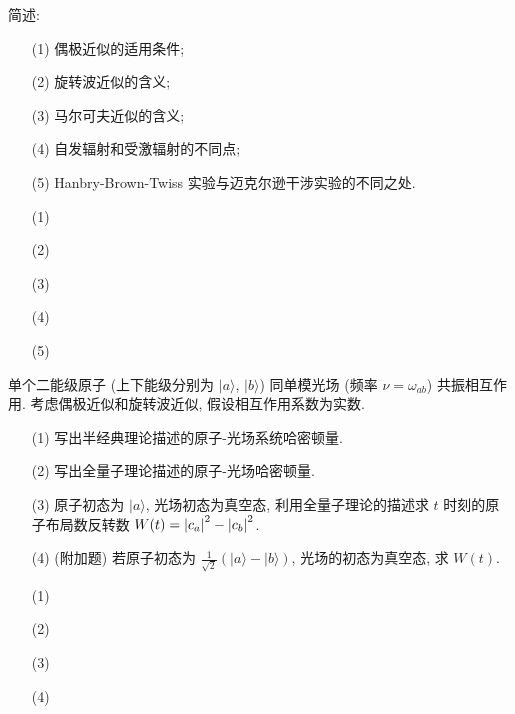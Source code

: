 \documentclass{assignment}
\begin{document}
\begin{prob}
    简述:
    \begin{itemize}
        \item[(1)] 偶极近似的适用条件;
        \item[(2)] 旋转波近似的含义;
        \item[(3)] 马尔可夫近似的含义;
        \item[(4)] 自发辐射和受激辐射的不同点;
        \item[(5)] Hanbry-Brown-Twiss 实验与迈克尔逊干涉实验的不同之处.
    \end{itemize}
\end{prob}
\begin{sol}
    \begin{itemize}
        \item[(1)] 
        \item[(2)] 
        \item[(3)] 
        \item[(4)] 
        \item[(5)] 
    \end{itemize}
\end{sol}

\begin{prob}
    单个二能级原子 (上下能级分别为 $\lvert a\rangle$, $\lvert b\rangle$) 同单模光场 (频率 $\nu=\omega_{ab}$) 共振相互作用. 考虑偶极近似和旋转波近似, 假设相互作用系数为实数.
    \begin{itemize}
        \item[(1)] 写出半经典理论描述的原子-光场系统哈密顿量.
        \item[(2)] 写出全量子理论描述的原子-光场哈密顿量.
        \item[(3)] 原子初态为 $\lvert a\rangle$, 光场初态为真空态, 利用全量子理论的描述求 $t$ 时刻的原子布局数反转数 $W(t)=\left\lvert c_a\right\rvert^2-\left\lvert c_b\right\rvert^2$.
        \item[(4)] (附加题) 若原子初态为 $\frac{1}{\sqrt{2}}(\lvert a\rangle-\lvert b\rangle)$, 光场的初态为真空态, 求 $W(t)$.
    \end{itemize}
\end{prob}
\begin{sol}
    \begin{itemize}
        \item[(1)] 
        \item[(2)] 
        \item[(3)] 
        \item[(4)] 
    \end{itemize}
\end{sol}
\end{document}
